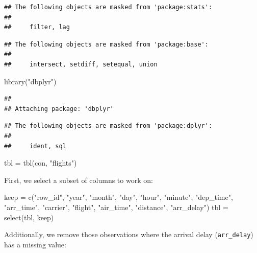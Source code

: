 \documentclass[
]{scrbook}
\newenvironment{Shaded}{\begin{snugshade}}{\end{snugshade}}
\newcommand{\FunctionTok}[1]{\textcolor[rgb]{0.00,0.00,0.00}{#1}}
\newcommand{\NormalTok}[1]{#1}
\newcommand{\OtherTok}[1]{\textcolor[rgb]{0.56,0.35,0.01}{#1}}
\newcommand{\StringTok}[1]{\textcolor[rgb]{0.31,0.60,0.02}{#1}}
\renewenvironment{Shaded} {\begin{snugshade}\small} {\end{snugshade}}
\begin{document}
\begin{verbatim}
## The following objects are masked from 'package:stats':
## 
##     filter, lag
\end{verbatim}

\begin{verbatim}
## The following objects are masked from 'package:base':
## 
##     intersect, setdiff, setequal, union
\end{verbatim}

\begin{Shaded}
\begin{Highlighting}[]
\FunctionTok{library}\NormalTok{(}\StringTok{"dbplyr"}\NormalTok{)}
\end{Highlighting}
\end{Shaded}

\begin{verbatim}
## 
## Attaching package: 'dbplyr'
\end{verbatim}

\begin{verbatim}
## The following objects are masked from 'package:dplyr':
## 
##     ident, sql
\end{verbatim}

\begin{Shaded}
\begin{Highlighting}[]
\NormalTok{tbl }\OtherTok{=} \FunctionTok{tbl}\NormalTok{(con, }\StringTok{"flights"}\NormalTok{)}
\end{Highlighting}
\end{Shaded}

First, we select a subset of columns to work on:

\begin{Shaded}
\begin{Highlighting}[]
\NormalTok{keep }\OtherTok{=} \FunctionTok{c}\NormalTok{(}\StringTok{"row\_id"}\NormalTok{, }\StringTok{"year"}\NormalTok{, }\StringTok{"month"}\NormalTok{, }\StringTok{"day"}\NormalTok{, }\StringTok{"hour"}\NormalTok{, }\StringTok{"minute"}\NormalTok{, }\StringTok{"dep\_time"}\NormalTok{,}
  \StringTok{"arr\_time"}\NormalTok{, }\StringTok{"carrier"}\NormalTok{, }\StringTok{"flight"}\NormalTok{, }\StringTok{"air\_time"}\NormalTok{, }\StringTok{"distance"}\NormalTok{, }\StringTok{"arr\_delay"}\NormalTok{)}
\NormalTok{tbl }\OtherTok{=} \FunctionTok{select}\NormalTok{(tbl, keep)}
\end{Highlighting}
\end{Shaded}

Additionally, we remove those observations where the arrival delay (\texttt{arr\_delay}) has a missing value:
\end{document}
